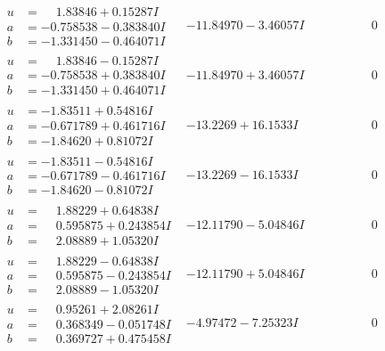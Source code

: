 \documentclass[1p]{elsarticle_modified}
\theoremstyle{definition}
\begin{document}
$$\begin{array}{c|c|c}
\begin{aligned}
u &= \phantom{-}1.83846 + 0.15287 I \\
a &= -0.758538 - 0.383840 I \\
b &= -1.331450 - 0.464071 I\end{aligned}
 & -11.84970 - 3.46057 I & \phantom{-0.000000 } 0 \\ \hline\begin{aligned}
u &= \phantom{-}1.83846 - 0.15287 I \\
a &= -0.758538 + 0.383840 I \\
b &= -1.331450 + 0.464071 I\end{aligned}
 & -11.84970 + 3.46057 I & \phantom{-0.000000 } 0 \\ \hline\begin{aligned}
u &= -1.83511 + 0.54816 I \\
a &= -0.671789 + 0.461716 I \\
b &= -1.84620 + 0.81072 I\end{aligned}
 & -13.2269 + 16.1533 I & \phantom{-0.000000 } 0 \\ \hline\begin{aligned}
u &= -1.83511 - 0.54816 I \\
a &= -0.671789 - 0.461716 I \\
b &= -1.84620 - 0.81072 I\end{aligned}
 & -13.2269 - 16.1533 I & \phantom{-0.000000 } 0 \\ \hline\begin{aligned}
u &= \phantom{-}1.88229 + 0.64838 I \\
a &= \phantom{-}0.595875 + 0.243854 I \\
b &= \phantom{-}2.08889 + 1.05320 I\end{aligned}
 & -12.11790 - 5.04846 I & \phantom{-0.000000 } 0 \\ \hline\begin{aligned}
u &= \phantom{-}1.88229 - 0.64838 I \\
a &= \phantom{-}0.595875 - 0.243854 I \\
b &= \phantom{-}2.08889 - 1.05320 I\end{aligned}
 & -12.11790 + 5.04846 I & \phantom{-0.000000 } 0 \\ \hline\begin{aligned}
u &= \phantom{-}0.95261 + 2.08261 I \\
a &= \phantom{-}0.368349 - 0.051748 I \\
b &= \phantom{-}0.369727 + 0.475458 I\end{aligned}
 & -4.97472 - 7.25323 I & \phantom{-0.000000 } 0\\

\end{array}$$
\end{document}
